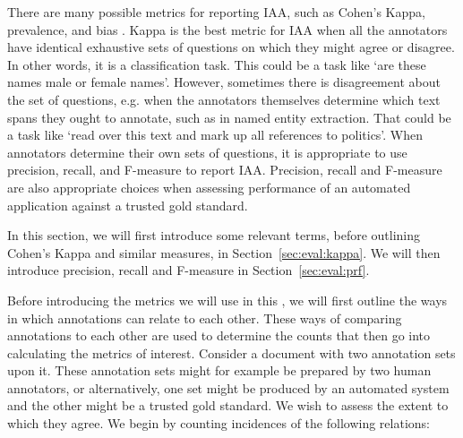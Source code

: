 There are many possible metrics for reporting IAA, such as Cohen's Kappa,
prevalence, and bias \cite{Eugenio04}. Kappa is the best metric for IAA when all
the annotators have identical exhaustive sets of questions on which they might
agree or disagree. In other words, it is a classification task. This could be a
task like `are these names male or female names'. However, sometimes there is
disagreement about the set of questions, e.g. when the annotators themselves
determine which text spans they ought to annotate, such as in named entity
extraction. That could be a task like `read over this text and mark up all
references to politics'. When annotators determine their own sets of questions,
it is appropriate to use precision, recall, and F-measure to report IAA.
Precision, recall and F-measure are also appropriate choices when assessing
performance of an automated application against a trusted gold standard.

In this section, we will first introduce some relevant terms, before outlining
Cohen's Kappa and similar measures, in Section~\ref{sec:eval:kappa}. We will then
introduce precision, recall and F-measure in Section~\ref{sec:eval:prf}.


Before introducing the metrics we will use in this \chapthing, we will first
outline the ways in which annotations can relate to each other. These ways of
comparing annotations to each other are used to determine the counts that then go
into calculating the metrics of interest. Consider a document with two annotation
sets upon it. These annotation sets might for example be prepared by two human
annotators, or alternatively, one set might be produced by an automated system
and the other might be a trusted gold standard. We wish to assess the extent to
which they agree. We begin by counting incidences of the following relations:

